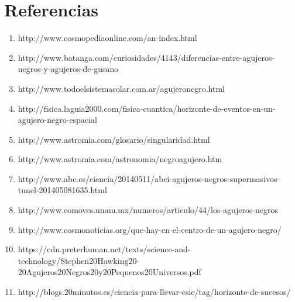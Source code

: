 \documentclass[12pt]{article}
\begin{document}
\section{Referencias}
\begin{enumerate}
	\item http://www.cosmopediaonline.com/an-index.html
	\item
	http://www.batanga.com/curiosidades/4143/diferencias-entre-agujeros-negros-y-agujeros-de-gusano
	\item
	http://www.todoelsistemasolar.com.ar/agujeronegro.html
	\item
	http://fisica.laguia2000.com/fisica-cuantica/horizonte-de-eventos-en-un-agujero-negro-espacial
	\item
	http://www.astromia.com/glosario/singularidad.html
	\item
	http://www.astromia.com/astronomia/negroagujero.htm
	\item
	http://www.abc.es/ciencia/20140511/abci-agujeros-negros-supermasivos-tunel-201405081635.html
	\item
	http://www.comoves.unam.mx/numeros/articulo/44/los-agujeros-negros
	\item
	http://www.cosmonoticias.org/que-hay-en-el-centro-de-un-agujero-negro/
	\item
	https://cdn.preterhuman.net/texts/science-and-technology/Stephen20Hawking20-20Agujeros20Negros20y20Pequenos20Universos.pdf 
	\item
	http://blogs.20minutos.es/ciencia-para-llevar-csic/tag/horizonte-de-sucesos/
\end{enumerate}
\end{document}
